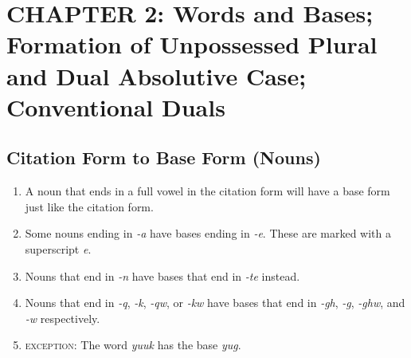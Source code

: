 \documentclass{article}
\begin{document}
\section{}

\section{CHAPTER 2: Words and Bases; Formation of Unpossessed Plural and Dual
Absolutive Case; Conventional Duals}

\subsection{Citation Form to Base Form (Nouns)}

\begin{enumerate}
\item A noun that ends in a full vowel in the citation form will have a base form just like the citation form.
\item Some nouns ending in \textit{-a} have bases ending in \textit{-e}. These are marked with a superscript \textit{e}.
\item Nouns that end in \textit{-n} have bases that end in \textit{-te} instead.
\item Nouns that end in \textit{-q}, \textit{-k}, \textit{-qw}, or \textit{-kw} have bases that end in \textit{-gh}, \textit{-g}, \textit{-ghw}, and \textit{-w} respectively.
\item \textsc{exception}: The word \textit{yuuk} has the base \textit{yug}.
\end{enumerate}
\end{document}
